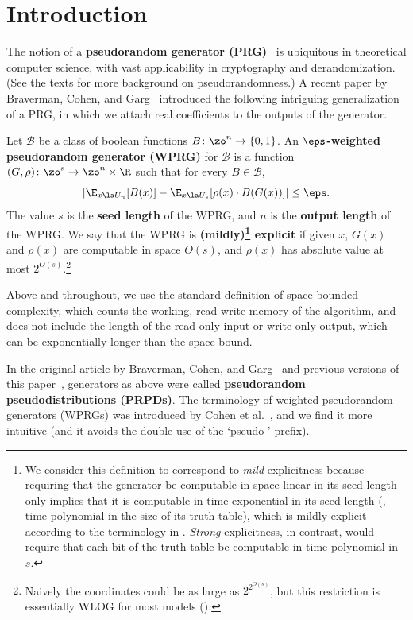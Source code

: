 
%
%
\section{Introduction}

The notion of a \textbf{pseudorandom generator (PRG)}~\cite{BlumMi84,Yao82,Nisan91,NisanWi94} is ubiquitous in theoretical computer science, with vast applicability in cryptography and derandomization.  (See the texts \cite{Goldreich10-prgprimer,vadhan2012pseudorandomness} for more background on pseudorandomness.)
A recent %
paper by %
Braverman, Cohen, and Garg~\cite{BravermanCoGa18} introduced the following intriguing generalization of a PRG, in which we attach real coefficients to the outputs of the generator. %

\begin{definition}\label{def:booleanWPRG}
	Let $\mathcal{B}$ be a class of boolean functions $B \colon \zo^n \to \{0, 1\}$. An \textbf{$\eps$-weighted pseudorandom generator (WPRG)} for $\mathcal{B}$ is a function $(G,\rho) \colon \zo^s \to \zo^n\times \R$ such that for every $B \in \mathcal{B}$,
	$$
		\left |\E_{x \la U_n}[B(x)] - \E_{x \la U_{s}}[\rho(x)\cdot B(G(x))]\right | \leq \eps.
	$$
	The value $s$ is the \textbf{seed length} of the WPRG, and $n$ is the \textbf{output length} of the WPRG. 
	We say that the WPRG is \textbf{(mildly)\footnote{We consider this definition to correspond to \emph{mild} explicitness because requiring that
	the generator be computable in space linear in its seed length only implies that it is computable in time exponential in its seed length (\ie, time polynomial in the size of its truth table), which is
	mildly explicit according to the terminology in \cite{vadhan2012pseudorandomness}.  \emph{Strong} explicitness, in contrast,
	would require that each bit of the truth table %
be %
computable in 
	time polynomial in $s$.} explicit} if given $x$, $G(x)$ and $\rho(x)$ are computable in space $O(s)$, and $\rho(x)$ 
	has absolute value at most $2^{O(s)}$.\footnote{Naively the coordinates could be as large as $2^{2^{O(s)}}$, but this restriction is essentially WLOG for most models ().}  %
\end{definition}
Above and throughout, we use the standard definition of space-bounded complexity, which counts the working, read-write memory of the algorithm, and does not include the length of the read-only input or write-only output, which can be exponentially longer than the space bound.

In the original %
article by %
Braverman, Cohen, and Garg~\cite{BravermanCoGa18} and previous versions of this paper~\cite{PyneVa20}, generators as above were called \textbf{pseudorandom pseudodistributions (PRPDs)}.  The terminology of weighted pseudorandom generators (WPRGs) was introduced
by Cohen et al.~\cite{CohenDoReSbTa21}, and we find it more intuitive
(and it avoids the double use of the `pseudo-' prefix).

